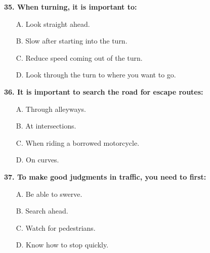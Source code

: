 \begin{minipage}{\linewidth}
\vspace{1em}\noindent\textbf{35. When turning, it is important to:}

\begin{itemize}[nosep,leftmargin=2em]
\item [A.] Look straight ahead.
\item [B.] Slow after starting into the turn.
\item [C.] Reduce speed coming out of the turn.
\item [D.] Look through the turn to where you want to go.

\end{itemize}
\end{minipage}


\begin{minipage}{\linewidth}
\vspace{1em}\noindent\textbf{36. It is important to search the road for escape routes:}

\begin{itemize}[nosep,leftmargin=2em]
\item [A.] Through alleyways.
\item [B.] At intersections.
\item [C.] When riding a borrowed motorcycle.
\item [D.] On curves.

\end{itemize}
\end{minipage}


\begin{minipage}{\linewidth}
\vspace{1em}\noindent\textbf{37. To make good judgments in traffic, you need to first:}

\begin{itemize}[nosep,leftmargin=2em]
\item [A.] Be able to swerve.
\item [B.] Search ahead.
\item [C.] Watch for pedestrians.
\item [D.] Know how to stop quickly.

\end{itemize}
\end{minipage}


